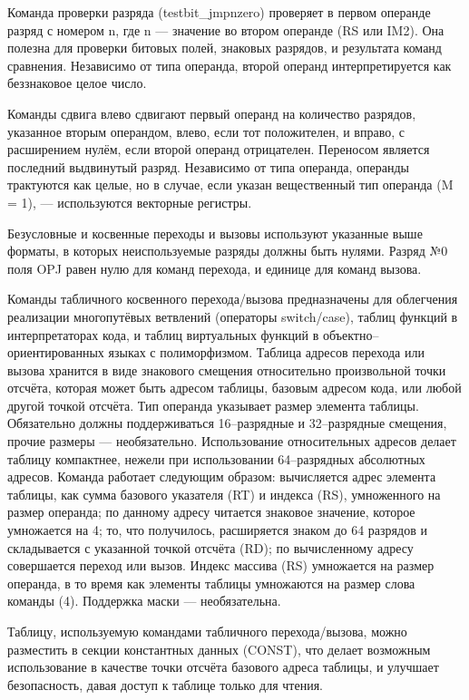 \documentclass[forwardcom.tex]{subfiles}
\begin{document}
Команда проверки разряда (testbit\_jmpnzero) проверяет в первом операнде разряд с номером n, где n --- значение во втором операнде (RS или IM2). Она полезна для проверки битовых полей, знаковых разрядов, и результата команд сравнения. Независимо от типа операнда, второй операнд интерпретируется как беззнаковое целое число.

Команды сдвига влево сдвигают первый операнд на количество разрядов, указанное вторым операндом, влево, если тот положителен, и вправо, с расширением нулём, если второй операнд отрицателен. Переносом является последний выдвинутый разряд. Независимо от типа операнда, операнды трактуются как целые, но в случае, если указан вещественный тип операнда (M = 1), --- используются векторные регистры.

Безусловные и косвенные переходы и вызовы используют указанные выше форматы, в которых неиспользуемые разряды должны быть нулями. Разряд №0 поля OPJ равен нулю для команд перехода, и единице для команд вызова.

\label{jumpTableInstruction}
Команды табличного косвенного перехода/вызова предназначены для облегчения реализации многопутёвых ветвлений (операторы switch/case), таблиц функций в интерпретаторах кода, и таблиц виртуальных функций в объектно--ориентированных языках с полиморфизмом. Таблица адресов перехода или вызова хранится в виде знакового смещения относительно произвольной точки отсчёта, которая может быть адресом таблицы, базовым адресом кода, или любой другой точкой отсчёта. Тип операнда указывает размер элемента таблицы. Обязательно должны поддерживаться 16--разрядные и 32--разрядные смещения, прочие размеры --- необязательно. Использование относительных адресов делает таблицу компактнее, нежели при использовании 64--разрядных абсолютных адресов. Команда работает следующим образом: вычисляется адрес элемента таблицы, как сумма базового указателя (RT) и индекса (RS), умноженного на размер операнда; по данному адресу читается знаковое значение, которое умножается на 4; то, что получилось, расширяется знаком до 64 разрядов и складывается с указанной точкой отсчёта (RD); по вычисленному адресу совершается переход или вызов. Индекс массива (RS) умножается на размер операнда, в то время как элементы таблицы умножаются на размер слова команды (4). Поддержка маски --- необязательна.

Таблицу, используемую командами табличного перехода/вызова, можно разместить в секции константных данных (CONST), что делает возможным использование в качестве точки отсчёта базового адреса таблицы, и улучшает безопасность, давая доступ к таблице только для чтения.
\end{document}
